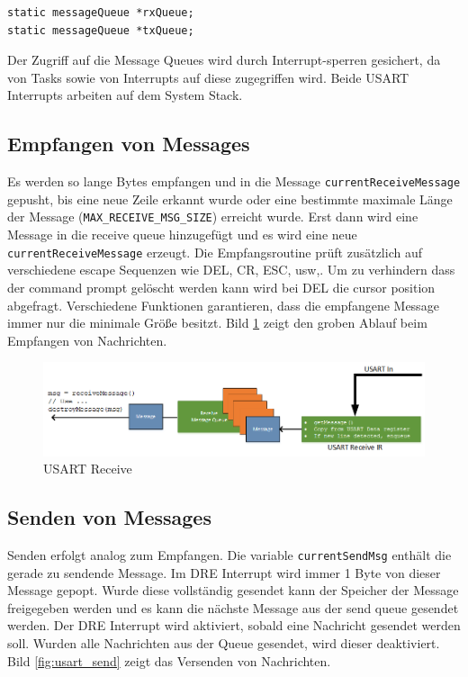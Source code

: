 \documentclass[fontsize=12pt, toc=bibliography, notitlepage]{scrreprt}
\begin{document}
\begin{lstlisting}
static messageQueue *rxQueue;
static messageQueue *txQueue;
\end{lstlisting}

Der Zugriff auf die Message Queues wird durch Interrupt-sperren gesichert, da von Tasks sowie von Interrupts auf diese zugegriffen wird. Beide USART Interrupts arbeiten auf dem System Stack.

\subsection{Empfangen von Messages}
Es werden so lange Bytes empfangen und in die Message \lstinline{currentReceiveMessage} gepusht, bis eine neue Zeile erkannt wurde oder eine bestimmte maximale Länge der Message (\lstinline{MAX_RECEIVE_MSG_SIZE}) erreicht wurde. Erst dann wird eine Message in die receive queue hinzugefügt und es wird eine neue \lstinline{currentReceiveMessage} erzeugt. Die Empfangsroutine prüft zusätzlich auf verschiedene escape Sequenzen wie DEL, CR, ESC, usw,. Um zu verhindern dass der command prompt gelöscht werden kann wird bei DEL die cursor position abgefragt. Verschiedene Funktionen garantieren, dass die empfangene Message immer nur die minimale Größe besitzt. Bild \ref{fig:usart_receive} zeigt den groben Ablauf beim Empfangen von Nachrichten.

\begin{figure}[H]
	\centering
	\includegraphics[width=450px]{images/UsartIn.png}
	\caption{USART Receive}
	\label{fig:usart_receive}
\end{figure}

\subsection{Senden von Messages}
Senden erfolgt analog zum Empfangen. Die variable \lstinline{currentSendMsg} enthält die gerade zu sendende Message. Im DRE Interrupt wird immer 1 Byte von dieser Message gepopt. Wurde diese vollständig gesendet kann der Speicher der Message freigegeben werden und es kann die nächste Message aus der send queue gesendet werden. Der DRE Interrupt wird aktiviert, sobald eine Nachricht gesendet werden soll. Wurden alle Nachrichten aus der Queue gesendet, wird dieser deaktiviert. Bild \ref{fig:usart_send} zeigt das Versenden von Nachrichten.
\end{document}
